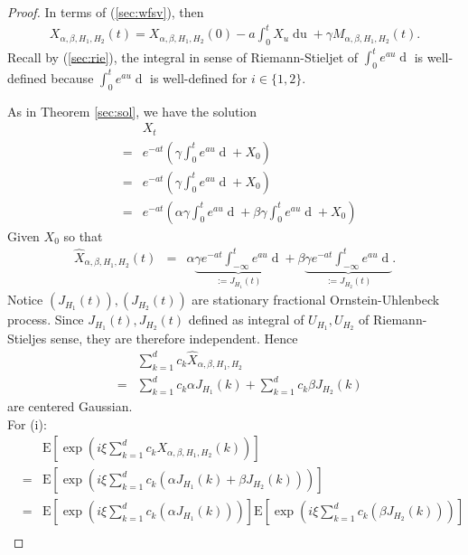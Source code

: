 \documentclass[a4paper, twoside, 11pt]{article}
\theoremstyle{definition}
\newcommand{\brkt}[1]{\left({#1} \right)}
\begin{document}
\begin{proof}
  In terms of (\ref{sec:wfsv}), then
  \begin{eqnarray*}
	X_{\alpha,\beta,H_1,H_2}(t) = X_{\alpha,\beta,H_1,H_2}(0) - a\int_0^t X_u \mathop{du} + \gamma M_{\alpha,\beta,H_1,H_2}(t).
\end{eqnarray*}
Recall by (\ref{sec:rie}), the integral in sense of Riemann-Stieljet of $\int_0^t e^{au} \mathop{dM_{\alpha,\beta,H_1,H_2}}$ is well-defined because $\int_0^t e^{au} \mathop{dU_{H_i}}$ is well-defined for $i\in\{1,2\}$.

As in Theorem \ref{sec:sol}, we have the solution
\begin{eqnarray*}
  &&X_t\\ 
  &=& e^{-at} \brkt{\gamma\int_0^t e^{au} \mathop{dM_{\alpha,\beta,H_1,H_2}} + X_0}\\
  &=&  e^{-at} \brkt{\gamma\int_0^t e^{au} \mathop{d(\alpha U_{H_1} + \beta U_{H_2})} + X_0}\\
  &=&  e^{-at} \brkt{\alpha \gamma\int_0^t e^{au} \mathop{d U_{H_1}} + \beta \gamma\int_0^t e^{au} \mathop{d U_{H_2}} + X_0}
\end{eqnarray*}
Given $X_0$ so that
\begin{eqnarray}
  \hat{X}_{\alpha,\beta,H_1,H_2}(t) &=&  \alpha \underbrace{\gamma e^{-at}\int_{-\infty}^t e^{au} \mathop{d U_{H_1}}}_{:=J_{H_1}(t)} + \beta\underbrace{ \gamma e^{-at}\int_{-\infty}^t e^{au} \mathop{d U_{H_2}}}_{:=J_{H_2}(t)}.
  \label{sec:jjj}
\end{eqnarray}
Notice $(J_{H_1}(t)), (J_{H_2}(t))$ are stationary fractional Ornstein-Uhlenbeck process. Since $J_{H_1}(t), J_{H_2}(t)$ defined as integral of $U_{H_1}, U_{H_2}$ of Riemann-Stieljes sense, they are therefore independent.  Hence 
\begin{eqnarray*}
  && \sum\limits_{k=1}^{d} c_k \hat{X}_{\alpha,\beta,H_1,H_2}\\
  &=& \sum\limits_{k=1}^{d} c_k \alpha J_{H_1}(k) + \sum\limits_{k=1}^{d} c_k \beta J_{H_2}(k)
\end{eqnarray*}
are centered Gaussian.\\
For (i): 
 \begin{eqnarray*}
   &&\mathrm{E}[\exp(i\xi\sum\limits_{k=1}^{d} c_k X_{\alpha,\beta,H_1,H_2}(k))]\\
   &=& \mathrm{E}[\exp(i\xi\sum\limits_{k=1}^{d} c_k (\alpha J_{H_1}(k) + \beta J_{H_2}(k)))]\\
   &=& \mathrm{E}[\exp(i\xi\sum\limits_{k=1}^{d} c_k (\alpha J_{H_1}(k)))]\mathrm{E}[\exp(i\xi\sum\limits_{k=1}^{d} c_k (\beta J_{H_2}(k)))] \\

\end{eqnarray*}
\end{proof}
\end{document}
